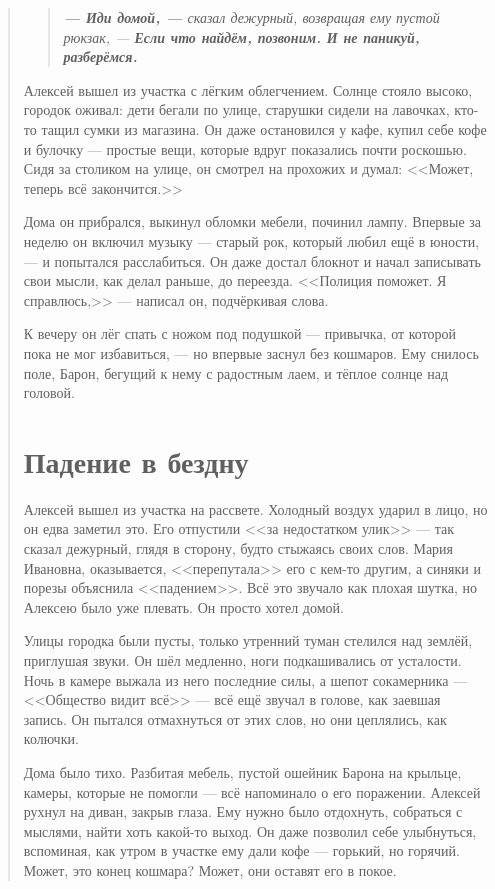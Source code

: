 \documentclass[12pt,a4paper]{book}
\newenvironment{dialogue}{\begin{quote}\itshape}{\end{quote}}
\begin{document}
\begin{dialogue}
\begin{dialogue}
\textbf{--- Иди домой, ---} сказал дежурный, возвращая ему пустой рюкзак, --- \textbf{Если что найдём, позвоним. И не паникуй, разберёмся.}
\end{dialogue}

Алексей вышел из участка с лёгким облегчением. Солнце стояло высоко, городок оживал: дети бегали по улице, старушки сидели на лавочках, кто-то тащил сумки из магазина. Он даже остановился у кафе, купил себе кофе и булочку --- простые вещи, которые вдруг показались почти роскошью. Сидя за столиком на улице, он смотрел на прохожих и думал: <<Может, теперь всё закончится.>>

Дома он прибрался, выкинул обломки мебели, починил лампу. Впервые за неделю он включил музыку --- старый рок, который любил ещё в юности, --- и попытался расслабиться. Он даже достал блокнот и начал записывать свои мысли, как делал раньше, до переезда. <<Полиция поможет. Я справлюсь,>> --- написал он, подчёркивая слова.

К вечеру он лёг спать с ножом под подушкой --- привычка, от которой пока не мог избавиться, --- но впервые заснул без кошмаров. Ему снилось поле, Барон, бегущий к нему с радостным лаем, и тёплое солнце над головой.

\chapter{Падение в бездну}

Алексей вышел из участка на рассвете. Холодный воздух ударил в лицо, но он едва заметил это. Его отпустили <<за недостатком улик>> --- так сказал дежурный, глядя в сторону, будто стыжаясь своих слов. Мария Ивановна, оказывается, <<перепутала>> его с кем-то другим, а синяки и порезы объяснила <<падением>>. Всё это звучало как плохая шутка, но Алексею было уже плевать. Он просто хотел домой.

Улицы городка были пусты, только утренний туман стелился над землёй, приглушая звуки. Он шёл медленно, ноги подкашивались от усталости. Ночь в камере выжала из него последние силы, а шепот сокамерника --- <<Общество видит всё>> --- всё ещё звучал в голове, как заевшая запись. Он пытался отмахнуться от этих слов, но они цеплялись, как колючки.

Дома было тихо. Разбитая мебель, пустой ошейник Барона на крыльце, камеры, которые не помогли --- всё напоминало о его поражении. Алексей рухнул на диван, закрыв глаза. Ему нужно было отдохнуть, собраться с мыслями, найти хоть какой-то выход. Он даже позволил себе улыбнуться, вспоминая, как утром в участке ему дали кофе --- горький, но горячий. Может, это конец кошмара? Может, они оставят его в покое.


\end{dialogue}
\end{document}
